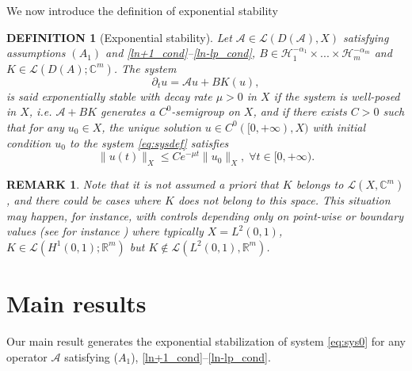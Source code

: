 \documentclass[11pt, dvipsnames]{amsart}
\newtheorem{rmk}[theorem]{REMARK}
\newtheorem{defn}[theorem]{DEFINITION}
\begin{document}
{\color{black}
We now introduce the definition of exponential stability 
\begin{defn}[Exponential stability]
\label{def:expstab}
Let $\mathcal{A}\in \mathcal{L}(D(\mathcal{A}),X)$ satisfying assumptions $(A_{1})$ and \eqref{ln+1_cond}--\eqref{ln-lp_cond}, $B\in \mathcal{H}_{1}^{-\alpha_{1}}\times...\times \mathcal{H}_{m}^{-\alpha_{m}}$
and $K\in \mathcal{L}(D(A);\mathbb{C}^{m})$. The system 
\begin{equation}
\label{eq:sysdef}
    \partial_{t}u = \mathcal{A}u+BK(u),
\end{equation}
is said exponentially stable with decay rate $\mu>0$ in $X$ if the system is well-posed in $X$, i.e. $\mathcal{A}+BK$ generates a $C^{0}$-semigroup on $X$, and if there exists $C>0$ such that for any $u_{0}\in X$, the unique solution $u\in C^{0}([0,+\infty),X)$ with initial condition $u_{0}$ to the system \eqref{eq:sysdef} satisfies
\begin{equation}
    \|u(t)\|_{X}\leq Ce^{-\mu t}\|u_{0}\|_{X},\;\forall t\in[0,+\infty).
\end{equation}
\end{defn}
\begin{rmk}
    Note that it is not assumed a priori that $K$ belongs to $\mathcal{L}(X,\mathbb{C}^{m})$, and there could be cases where $K$ does not belong to this space. This situation may happen, for instance, with controls depending only on point-wise or boundary values (see for instance \cite{BastinCoronBook}) where typically $X=L^{2}(0,1)$, $K\in \mathcal{L}(H^{1}(0,1);\mathbb{R}^{m})$ but $K\notin \mathcal{L}(L^{2}(0,1),\mathbb{R}^{m})$.
\end{rmk}
}

 

\section{Main results}
Our main result generates the exponential stabilization of system \eqref{eq:sys0} for any operator $\mathcal{A}$ satisfying ($A_{1}$), \eqref{ln+1_cond}--\eqref{ln-lp_cond}.
\end{document}

